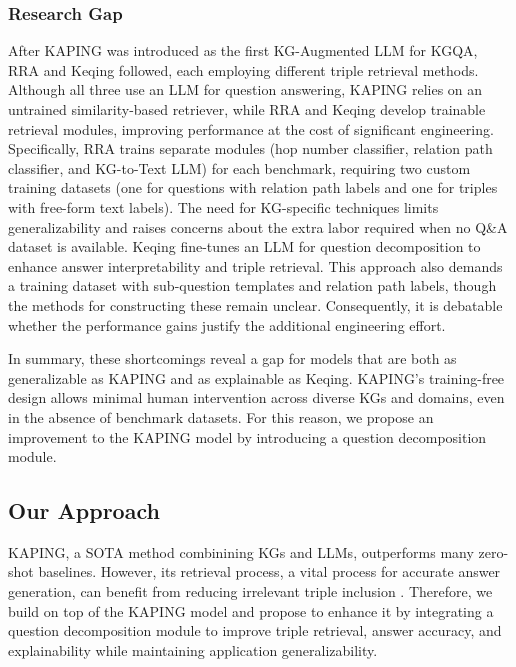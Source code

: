 \documentclass[pdflatex,sn-mathphys-num]{sn-jnl}%
\theoremstyle{thmstyleone}%
\theoremstyle{thmstyletwo}%
\theoremstyle{thmstylethree}%
\begin{document}
\subsubsection{Research Gap}

After KAPING was introduced as the first KG-Augmented LLM for KGQA, RRA \cite{Wu2023} and Keqing \cite{Wang2023} followed, each employing different triple retrieval methods. Although all three use an LLM for question answering, KAPING relies on an untrained similarity-based retriever, while RRA and Keqing develop trainable retrieval modules, improving performance at the cost of significant engineering. Specifically, RRA trains separate modules (hop number classifier, relation path classifier, and KG-to-Text LLM) for each benchmark, requiring two custom training datasets (one for questions with relation path labels and one for triples with free-form text labels). The need for KG-specific techniques limits generalizability and raises concerns about the extra labor required when no Q\&A dataset is available. Keqing fine-tunes an LLM for question decomposition to enhance answer interpretability and triple retrieval. This approach also demands a training dataset with sub-question templates and relation path labels, though the methods for constructing these remain unclear. Consequently, it is debatable whether the performance gains justify the additional engineering effort.

In summary, these shortcomings reveal a gap for models that are both as generalizable as KAPING and as explainable as Keqing. KAPING’s training-free design allows minimal human intervention across diverse KGs and domains, even in the absence of benchmark datasets. For this reason, we propose an improvement to the KAPING model by introducing a question decomposition module.

\subsection{Our Approach}
\label{sec:proposed_solution}

KAPING, a SOTA method combinining KGs and LLMs, outperforms many zero-shot baselines. However, its retrieval process, a vital process for accurate answer generation, can benefit from reducing irrelevant triple inclusion \cite{Baek2023}. Therefore, we build on top of the KAPING model and propose to enhance it by integrating a question decomposition module to improve triple retrieval, answer accuracy, and explainability while maintaining application generalizability. 
\end{document}
